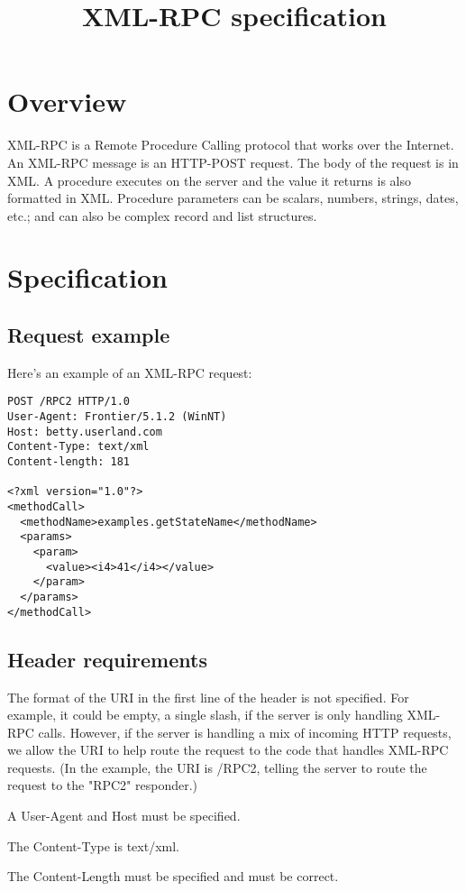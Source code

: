 \documentclass[10pt]{article}
\title{XML-RPC specification}
\begin{document}
%
%

\section{Overview}

XML-RPC is a Remote Procedure Calling protocol that works over the Internet.
An XML-RPC message is an HTTP-POST request. The body of the request is in XML. A procedure executes on the server and the value it returns is also formatted in XML.
Procedure parameters can be scalars, numbers, strings, dates, etc.; and can also be complex record and list structures.


%
%

\section{Specification}

\subsection{Request example}

Here's an example of an XML-RPC request:
\begin{verbatim}
POST /RPC2 HTTP/1.0
User-Agent: Frontier/5.1.2 (WinNT)
Host: betty.userland.com
Content-Type: text/xml
Content-length: 181

<?xml version="1.0"?>
<methodCall>
  <methodName>examples.getStateName</methodName>
  <params>
    <param>
      <value><i4>41</i4></value>
    </param>
  </params>
</methodCall>
\end{verbatim}

\subsection{Header requirements}

The format of the URI in the first line of the header is not specified. For example, it could be empty, a single slash, if the server is only handling XML-RPC calls. However, if the server is handling a mix of incoming HTTP requests, we allow the URI to help route the request to the code that handles XML-RPC requests. (In the example, the URI is /RPC2, telling the server to route the request to the "RPC2" responder.)

A User-Agent and Host must be specified.

The Content-Type is text/xml.

The Content-Length must be specified and must be correct.
\end{document}
